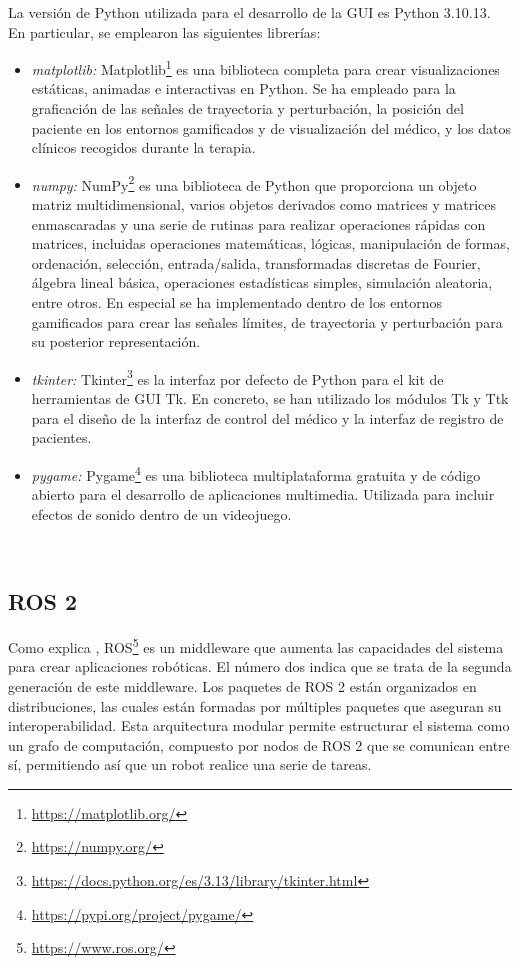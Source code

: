 La versión de Python utilizada para el desarrollo de la GUI es Python 3.10.13. En particular, se emplearon las siguientes librerías:

\begin{itemize}
    \item \textit{matplotlib:} Matplotlib\footnote{\url{https://matplotlib.org/}} es una biblioteca completa para crear visualizaciones estáticas, animadas e interactivas en Python. Se ha empleado para la graficación de las señales de trayectoria y perturbación, la posición del paciente en los entornos gamificados y de visualización del médico, y los datos clínicos recogidos durante la terapia.
    \item \textit{numpy:} NumPy\footnote{\url{https://numpy.org/}} es una biblioteca de Python que proporciona un objeto matriz multidimensional, varios objetos derivados como matrices y matrices enmascaradas y una serie de rutinas para realizar operaciones rápidas con matrices, incluidas operaciones matemáticas, lógicas, manipulación de formas, ordenación, selección, entrada/salida, transformadas discretas de Fourier, álgebra lineal básica, operaciones estadísticas simples, simulación aleatoria, entre otros. En especial se ha implementado dentro de los entornos gamificados para crear las señales límites, de trayectoria y perturbación para su posterior representación.
    \item \textit{tkinter:} Tkinter\footnote{\url{https://docs.python.org/es/3.13/library/tkinter.html}} es la interfaz por defecto de Python para el kit de herramientas de GUI Tk. En concreto, se han utilizado los módulos Tk y Ttk para el diseño de la interfaz de control del médico y la interfaz de registro de pacientes.
	\item \textit{pygame:} Pygame\footnote{\url{https://pypi.org/project/pygame/}} es una biblioteca multiplataforma gratuita y de código abierto para el desarrollo de aplicaciones multimedia. Utilizada para incluir efectos de sonido dentro de un videojuego.
\end{itemize}\

\subsection{ROS 2}
\label{sec:entornos}

Como explica \cite{perales10a}, ROS\footnote{\url{https://www.ros.org/}} es un middleware que aumenta las capacidades del sistema para crear aplicaciones robóticas. El número dos indica que se trata de la segunda generación de este middleware.
Los paquetes de ROS 2 están organizados en distribuciones, las cuales están formadas por múltiples paquetes que aseguran su interoperabilidad.
Esta arquitectura modular permite estructurar el sistema como un grafo de computación, compuesto por nodos de ROS 2 que se comunican entre sí, permitiendo así que un robot realice una serie de tareas.

